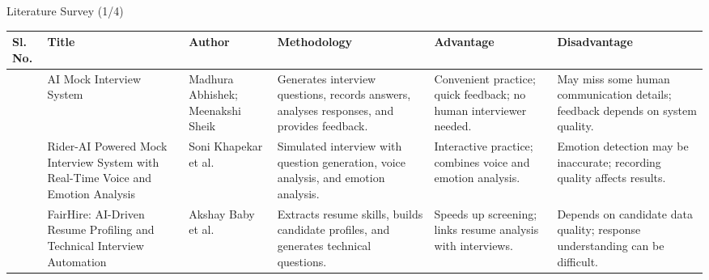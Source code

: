 \documentclass[aspectratio=169,11pt]{beamer}
\newcommand{\litrow}[6]{#1 & #2 & #3 & #4 & #5 & #6\\\hline}
\begin{document}
\begin{frame}{Literature Survey (1/4)}
\scriptsize
\setlength{\tabcolsep}{3pt}
\renewcommand{\arraystretch}{1.15}
\begin{tabularx}{\textwidth}{|>{\centering\arraybackslash}p{}|p{}|p{}|Y|Y|Y|}
\hline
\textbf{Sl. No.} & \textbf{Title} & \textbf{Author} & \textbf{Methodology} & \textbf{Advantage} & \textbf{Disadvantage}\\
\hline
\litrow{1}{AI Mock Interview System}{Madhura Abhishek; Meenakshi Sheik}{Generates interview questions, records answers, analyses responses, and provides feedback.}{Convenient practice; quick feedback; no human interviewer needed.}{May miss some human communication details; feedback depends on system quality.}
\litrow{2}{Rider-AI Powered Mock Interview System with Real-Time Voice and Emotion Analysis}{Soni Khapekar et al.}{Simulated interview with question generation, voice analysis, and emotion analysis.}{Interactive practice; combines voice and emotion analysis.}{Emotion detection may be inaccurate; recording quality affects results.}
\litrow{3}{FairHire: AI-Driven Resume Profiling and Technical Interview Automation}{Akshay Baby et al.}{Extracts resume skills, builds candidate profiles, and generates technical questions.}{Speeds up screening; links resume analysis with interviews.}{Depends on candidate data quality; response understanding can be difficult.}
\end{tabularx}
\end{frame}
\end{document}
